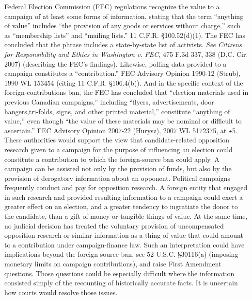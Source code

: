 Federal Election Commission (FEC) regulations recognize the value to a campaign of at least some forms of information, stating that the term ``anything of value'' includes ``the provision of any goods or services without charge,'' such as ``membership lists'' and ``mailing lists.''
11 C.F.R. \S 100.52(d)(1).
The FEC has concluded that the phrase includes a state-by-state list of activists.
\textit{See Citizens for Responsibility and Ethics in Washington v. FEC}, 475 F.3d 337, 338 (D.C. Cir. 2007) (describing the FEC's findings).
Likewise, polling data provided to a campaign constitutes a ``contribution.''
FEC Advisory Opinion 1990-12 (Strub), 1990 WL 153454 (citing 11 C.F.R. \S 106.4(b)).
And in the specific context of the foreign-contributions ban, the FEC has concluded that ``election materials used in previous Canadian campaigns,'' including ``flyers, advertisements, door hangers,tri-folds, signs, and other printed material,'' constitute ``anything of value,'' even though ``the value of these materials may be nominal or difficult to ascertain.''
FEC Advisory Opinion 2007-22 (Hurysz), 2007 WL 5172375, at $\star$5.
These authorities would support the view that candidate-related opposition research given to a campaign for the purpose of influencing an election could constitute a contribution to which the foreign-source ban could apply.
A campaign can be assisted not only by the provision of funds, but also by the provision of derogatory information about an opponent.
Political campaigns frequently conduct and pay for opposition research.
A foreign entity that engaged in such research and provided resulting information to a campaign could exert a greater effect on an election, and a greater tendency to ingratiate the donor to the candidate, than a gift of money or tangible things of value.
At the same time, no judicial decision has treated the voluntary provision of uncompensated opposition research or similar information as a thing of value that could amount to a contribution under campaign-finance law.
Such an interpretation could have implications beyond the foreign-source ban, see 52 U.S.C. \S 30116(a) (imposing monetary limits on campaign contributions), and raise First Amendment questions.
Those questions could be especially difficult where the information consisted simply of the recounting of historically accurate facts.
It is uncertain how courts would resolve those issues.

